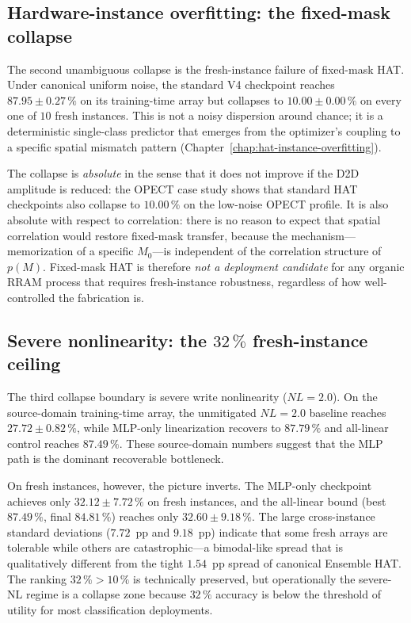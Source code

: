 \subsection{Hardware-instance overfitting: the fixed-mask collapse}

The second unambiguous collapse is the fresh-instance failure of fixed-mask HAT.  Under canonical uniform noise, the standard V4 checkpoint reaches $87.95\pm0.27\,\%$ on its training-time array but collapses to $10.00\pm0.00\,\%$ on every one of $10$ fresh instances.  This is not a noisy dispersion around chance; it is a deterministic single-class predictor that emerges from the optimizer's coupling to a specific spatial mismatch pattern (Chapter~\ref{chap:hat-instance-overfitting}).

The collapse is \emph{absolute} in the sense that it does not improve if the D2D amplitude is reduced: the OPECT case study shows that standard HAT checkpoints also collapse to $10.00\,\%$ on the low-noise OPECT profile.  It is also absolute with respect to correlation: there is no reason to expect that spatial correlation would restore fixed-mask transfer, because the mechanism---memorization of a specific $M_{0}$---is independent of the correlation structure of $p(M)$.  Fixed-mask HAT is therefore \emph{not a deployment candidate} for any organic RRAM process that requires fresh-instance robustness, regardless of how well-controlled the fabrication is.

\subsection{Severe nonlinearity: the $32\,\%$ fresh-instance ceiling}

The third collapse boundary is severe write nonlinearity ($NL=2.0$).  On the source-domain training-time array, the unmitigated $NL=2.0$ baseline reaches $27.72\pm0.82\,\%$, while MLP-only linearization recovers to $87.79\,\%$ and all-linear control reaches $87.49\,\%$.  These source-domain numbers suggest that the MLP path is the dominant recoverable bottleneck.

On fresh instances, however, the picture inverts.  The MLP-only checkpoint achieves only $32.12\pm7.72\,\%$ on fresh instances, and the all-linear bound (best $87.49\,\%$, final $84.81\,\%$) reaches only $32.60\pm9.18\,\%$.  The large cross-instance standard deviations ($7.72$~pp and $9.18$~pp) indicate that some fresh arrays are tolerable while others are catastrophic---a bimodal-like spread that is qualitatively different from the tight $1.54$~pp spread of canonical Ensemble HAT.  The ranking $32\,\% > 10\,\%$ is technically preserved, but operationally the severe-NL regime is a collapse zone because $32\,\%$ accuracy is below the threshold of utility for most classification deployments.

